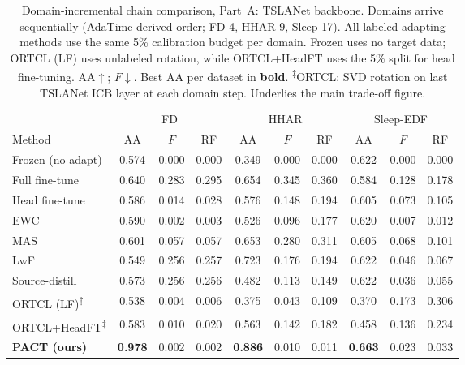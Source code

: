 \begin{table}[t]
\centering
\caption{Domain-incremental chain comparison, Part~A: TSLANet backbone.
Domains arrive sequentially (AdaTime-derived order; FD 4, HHAR 9, Sleep 17).
All labeled adapting methods use the same 5\% calibration budget per domain.
Frozen uses no target data; ORTCL (LF) uses unlabeled rotation, while
ORTCL+HeadFT uses the 5\% split for head fine-tuning.
AA$\uparrow$; $F$$\downarrow$. Best AA per dataset in \textbf{bold}.
\textsuperscript{$\ddagger$}ORTCL: SVD rotation on last TSLANet ICB layer at each domain step.
Underlies the main trade-off figure.}
\label{tab:chain-tslanet}
\small
\begin{tabular}{l ccc ccc ccc}
\toprule
& \multicolumn{3}{c}{FD} & \multicolumn{3}{c}{HHAR} & \multicolumn{3}{c}{Sleep-EDF}\\
\cmidrule(lr){2-4}\cmidrule(lr){5-7}\cmidrule(lr){8-10}
Method & AA & $F$ & RF & AA & $F$ & RF & AA & $F$ & RF\\
\midrule
Frozen (no adapt) & 0.574 & 0.000 & 0.000 & 0.349 & 0.000 & 0.000 & 0.622 & 0.000 & 0.000\\
Full fine-tune & 0.640 & 0.283 & 0.295 & 0.654 & 0.345 & 0.360 & 0.584 & 0.128 & 0.178\\
Head fine-tune & 0.586 & 0.014 & 0.028 & 0.576 & 0.148 & 0.194 & 0.605 & 0.073 & 0.105\\
EWC & 0.590 & 0.002 & 0.003 & 0.526 & 0.096 & 0.177 & 0.620 & 0.007 & 0.012\\
MAS & 0.601 & 0.057 & 0.057 & 0.653 & 0.280 & 0.311 & 0.605 & 0.068 & 0.101\\
LwF & 0.549 & 0.256 & 0.257 & 0.723 & 0.176 & 0.194 & 0.622 & 0.046 & 0.067\\
Source-distill & 0.573 & 0.256 & 0.256 & 0.482 & 0.113 & 0.149 & 0.622 & 0.036 & 0.055\\
ORTCL (LF)\textsuperscript{$\ddagger$} & 0.538 & 0.004 & 0.006 & 0.375 & 0.043 & 0.109 & 0.370 & 0.173 & 0.306\\
ORTCL+HeadFT\textsuperscript{$\ddagger$} & 0.583 & 0.010 & 0.020 & 0.563 & 0.142 & 0.182 & 0.458 & 0.136 & 0.234\\
\textbf{PACT (ours)} & \textbf{0.978} & 0.002 & 0.002 & \textbf{0.886} & 0.010 & 0.011 & \textbf{0.663} & 0.023 & 0.033\\
\bottomrule
\end{tabular}
\end{table}

